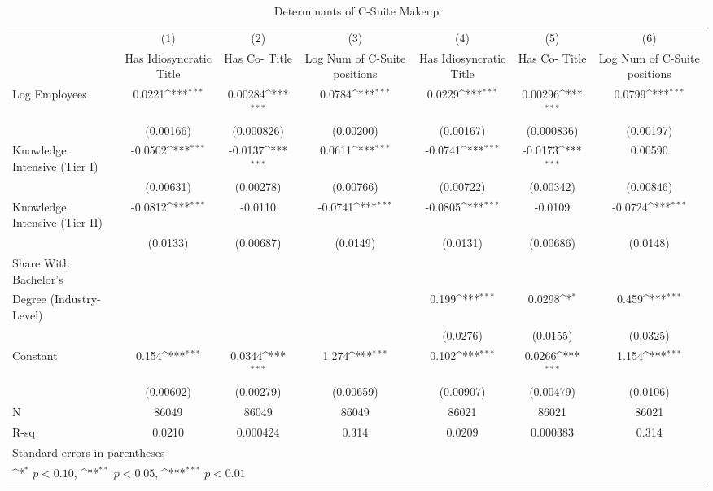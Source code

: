 \begin{table}[htbp]\centering
\def\sym#1{\ifmmode^{#1}\else\(^{#1}\)\fi}
\caption{Determinants of C-Suite Makeup\label{tab1}}
\begin{tabular}{l*{6}{c}}
\toprule
                &\multicolumn{1}{c}{(1)}&\multicolumn{1}{c}{(2)}&\multicolumn{1}{c}{(3)}&\multicolumn{1}{c}{(4)}&\multicolumn{1}{c}{(5)}&\multicolumn{1}{c}{(6)}\\
                &\multicolumn{1}{c}{Has Idiosyncratic Title}&\multicolumn{1}{c}{Has Co- Title}&\multicolumn{1}{c}{Log Num of C-Suite positions}&\multicolumn{1}{c}{Has Idiosyncratic Title}&\multicolumn{1}{c}{Has Co- Title}&\multicolumn{1}{c}{Log Num of C-Suite positions}\\
\midrule
Log Employees   &   0.0221\sym{***}&  0.00284\sym{***}&   0.0784\sym{***}&   0.0229\sym{***}&  0.00296\sym{***}&   0.0799\sym{***}\\
                &(0.00166)         &(0.000826)         &(0.00200)         &(0.00167)         &(0.000836)         &(0.00197)         \\
Knowledge Intensive (Tier I)&  -0.0502\sym{***}&  -0.0137\sym{***}&   0.0611\sym{***}&  -0.0741\sym{***}&  -0.0173\sym{***}&  0.00590         \\
                &(0.00631)         &(0.00278)         &(0.00766)         &(0.00722)         &(0.00342)         &(0.00846)         \\
Knowledge Intensive (Tier II)&  -0.0812\sym{***}&  -0.0110         &  -0.0741\sym{***}&  -0.0805\sym{***}&  -0.0109         &  -0.0724\sym{***}\\
                & (0.0133)         &(0.00687)         & (0.0149)         & (0.0131)         &(0.00686)         & (0.0148)         \\
Share With Bachelor's \\ Degree (Industry-Level)&                  &                  &                  &    0.199\sym{***}&   0.0298\sym{*}  &    0.459\sym{***}\\
                &                  &                  &                  & (0.0276)         & (0.0155)         & (0.0325)         \\
Constant        &    0.154\sym{***}&   0.0344\sym{***}&    1.274\sym{***}&    0.102\sym{***}&   0.0266\sym{***}&    1.154\sym{***}\\
                &(0.00602)         &(0.00279)         &(0.00659)         &(0.00907)         &(0.00479)         & (0.0106)         \\
\midrule
N               &    86049         &    86049         &    86049         &    86021         &    86021         &    86021         \\
R-sq            &   0.0210         & 0.000424         &    0.314         &   0.0209         & 0.000383         &    0.314         \\
\bottomrule
\multicolumn{7}{l}{\footnotesize Standard errors in parentheses}\\
\multicolumn{7}{l}{\footnotesize \sym{*} \(p<0.10\), \sym{**} \(p<0.05\), \sym{***} \(p<0.01\)}\\
\end{tabular}
\end{table}
